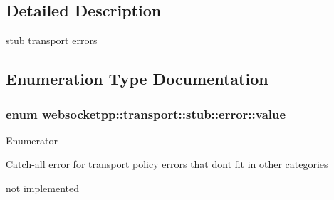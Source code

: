 \subsection{Detailed Description}
stub transport errors 

\subsection{Enumeration Type Documentation}
\hypertarget{namespacewebsocketpp_1_1transport_1_1stub_1_1error_abff42d9e608f90864af8d628f6932022}{}
\subsubsection[{value}]{\setlength{\rightskip}{0pt plus 5cm}enum {\bf websocketpp\+::transport\+::stub\+::error\+::value}}\label{namespacewebsocketpp_1_1transport_1_1stub_1_1error_abff42d9e608f90864af8d628f6932022}
\begin{Desc}
\item[Enumerator]\par
\begin{description}
\item[{\em 
\hypertarget{namespacewebsocketpp_1_1transport_1_1stub_1_1error_abff42d9e608f90864af8d628f6932022a62b9c9a1d537b94775fc8a8db6ff942e}{}general\label{namespacewebsocketpp_1_1transport_1_1stub_1_1error_abff42d9e608f90864af8d628f6932022a62b9c9a1d537b94775fc8a8db6ff942e}
}]Catch-\/all error for transport policy errors that don\textquotesingle{}t fit in other categories \item[{\em 
\hypertarget{namespacewebsocketpp_1_1transport_1_1stub_1_1error_abff42d9e608f90864af8d628f6932022ac4e3eebdd5ac574285cde2df484f0aae}{}not\+\_\+implemented\label{namespacewebsocketpp_1_1transport_1_1stub_1_1error_abff42d9e608f90864af8d628f6932022ac4e3eebdd5ac574285cde2df484f0aae}
}]not implemented \end{description}
\end{Desc}


